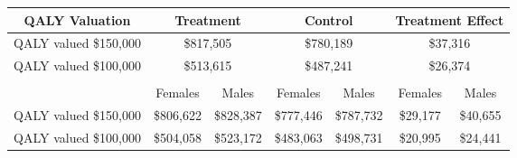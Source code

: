 \begin{tabular}{ccccccc}
\hline \hline
QALY Valuation &  \multicolumn{2}{c}{Treatment}   & \multicolumn{2}{c}{Control} & \multicolumn{2}{c}{Treatment Effect}  \\ \hline

QALY valued \$150,000 &	\multicolumn{2}{c}{\$817,505  }	& \multicolumn{2}{c}{ \$780,189  } & \multicolumn{2}{c}{\$37,316 } \\ 
QALY valued \$100,000 & \multicolumn{2}{c}{ \$513,615   } & \multicolumn{2}{c}{\$487,241 }	&	\multicolumn{2}{c}{\$26,374 } \\ \hline 
&&&&&& \\
& Females & Males & Females & Males & Females & Males \\ \hline
QALY valued \$150,000 & \$806,622 	& \$828,387 	& \$777,446 	& \$787,732 	& \$29,177 	& \$40,655  \\
QALY valued \$100,000 & \$504,058 	& \$523,172 	& \$483,063 	& \$498,731 	& \$20,995 	& \$24,441  \\ 
\hline \hline 
\end{tabular}

